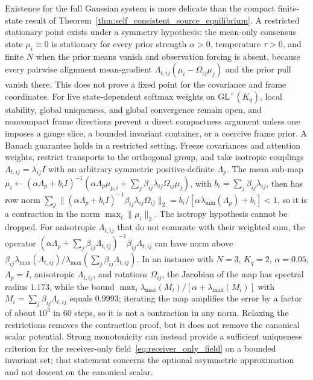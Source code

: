 \documentclass[11pt]{article}
\begin{document}
Existence for the full Gaussian system is more delicate than the compact finite-state result of Theorem~\ref{thm:self_consistent_source_equilibrium}. A restricted stationary point exists under a symmetry hypothesis: the mean-only consensus state $\mu_i \equiv 0$ is stationary for every prior strength $\alpha>0$, temperature $\tau>0$, and finite $N$ when the prior means vanish and observation forcing is absent, because every pairwise alignment mean-gradient $\Lambda_{t,ij}(\mu_i-\Omega_{ij}\mu_j)$ and the prior pull vanish there. This does not prove a fixed point for the covariance and frame coordinates. For live state-dependent softmax weights on $\mathrm{GL}^+(K_q)$, local stability, global uniqueness, and global convergence remain open, and noncompact frame directions prevent a direct compactness argument unless one imposes a gauge slice, a bounded invariant container, or a coercive frame prior. A Banach guarantee holds in a restricted setting. Freeze covariances and attention weights, restrict transports to the orthogonal group, and take isotropic couplings $\Lambda_{t,ij}=\lambda_{ij}I$ with an arbitrary symmetric positive-definite $\Lambda_p$. The mean sub-map $\mu_i\leftarrow(\alpha\Lambda_p+b_iI)^{-1}(\alpha\Lambda_p\mu_{p,i}+\sum_j\beta_{ij}\lambda_{ij}\Omega_{ij}\mu_j)$, with $b_i=\sum_j\beta_{ij}\lambda_{ij}$, then has row norm $\sum_j\|(\alpha\Lambda_p+b_iI)^{-1}\beta_{ij}\lambda_{ij}\Omega_{ij}\|_2=b_i/[\alpha\lambda_{\min}(\Lambda_p)+b_i]<1$, so it is a contraction in the norm $\max_i\|\mu_i\|_2$. The isotropy hypothesis cannot be dropped. For anisotropic $\Lambda_{t,ij}$ that do not commute with their weighted sum, the operator $(\alpha\Lambda_p+\sum_j\beta_{ij}\Lambda_{t,ij})^{-1}\beta_{ij}\Lambda_{t,ij}$ can have norm above $\beta_{ij}\lambda_{\max}(\Lambda_{t,ij})/\lambda_{\max}(\sum_j\beta_{ij}\Lambda_{t,ij})$. In an instance with $N=3$, $K_q=2$, $\alpha=0.05$, $\Lambda_p=I$, anisotropic $\Lambda_{t,ij}$, and rotations $\Omega_{ij}$, the Jacobian of the map has spectral radius $1.173$, while the bound $\max_i\lambda_{\max}(M_i)/[\alpha+\lambda_{\max}(M_i)]$ with $M_i=\sum_j\beta_{ij}\Lambda_{t,ij}$ equals $0.9993$; iterating the map amplifies the error by a factor of about $10^3$ in $60$ steps, so it is not a contraction in any norm. Relaxing the restrictions removes the contraction proof, but it does not remove the canonical scalar potential. Strong monotonicity can instead provide a sufficient uniqueness criterion for the receiver-only field~\eqref{eq:receiver_only_field} on a bounded invariant set; that statement concerns the optional asymmetric approximation and not descent on the canonical scalar.
\end{document}
